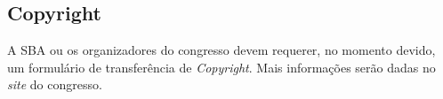 \subsection{Copyright}

A SBA ou os organizadores do congresso devem requerer, no momento devido, 
um formulário de transferência de {\em Copyright}. Mais informações serão
dadas no {\em site} do congresso.
